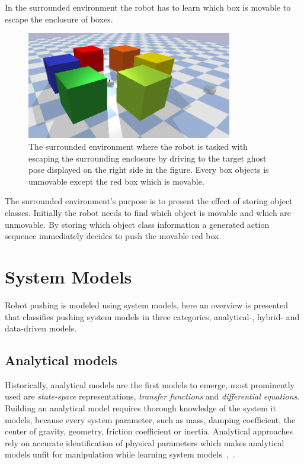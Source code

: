 In the surrounded environment the robot has to learn which box is movable to escape the enclosure of boxes.\bs
\begin{figure}[H]
  \centering
  \includegraphics[width=0.8\textwidth]{figures/results/surrounded}
  \caption{The surrounded environment where the robot is tasked with escaping the surrounding enclosure by driving to the target ghost pose displayed on the right side in the figure. Every box objects is unmovable except the red box which is movable.}%
  \label{fig:benchmark_surrounded}
\end{figure}
The surrounded environment's purpose is to present the effect of storing object classes. Initially the robot needs to find which object is movable and which are unmovable. By storing which object class information a generated action sequence immediately decides to push the movable red box.\bs

\chapter*{System Models}%
Robot pushing is modeled using system models, here an overview is presented that classifies pushing system models in three categories, analytical-, hybrid- and data-driven models.\bs

\section*{Analytical models}
Historically, analytical models are the first models to emerge, most prominently used are \textit{state-space} representations, \textit{transfer functions} and \textit{differential equations}. Building an analytical model requires thorough knowledge of the system it models, because every system parameter, such as mass, damping coefficient, the center of gravity, geometry, friction coefficient or inertia. Analytical approaches rely on accurate identification of physical parameters which makes analytical models unfit for manipulation while learning system models~\cite{arruda_uncertainty_2017},~\cite{stuber_featurebased_2018}.\\

